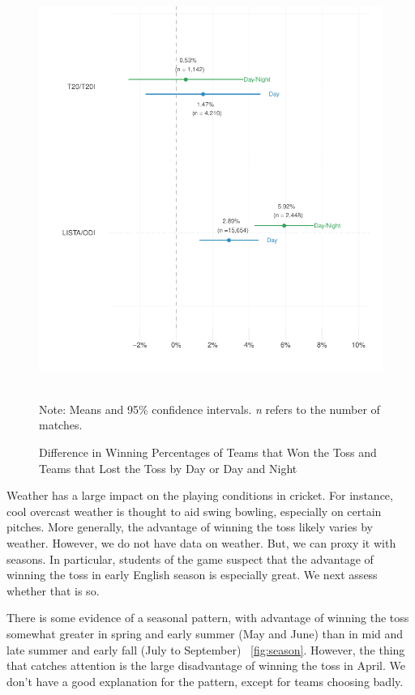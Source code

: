 \documentclass[12pt]{article}
\begin{document}
\begin{figure}[htbp]
\centering
\caption{Difference in Winning Percentages of Teams that Won the Toss and Teams that Lost the Toss by Day or Day and Night}
\includegraphics[scale=.95]{../figs/winbyDayNight.pdf}
{\footnotesize \\ Note: Means and 95\% confidence intervals. \emph{n} refers to the number of matches.\par}
\label{fig:dn}
\end{figure}

Weather has a large impact on the playing conditions in cricket. For instance, cool overcast weather is thought to aid swing bowling, especially on certain pitches. More generally, the advantage of winning the toss likely varies by weather. However, we do not have data on weather. But, we can proxy it with seasons. In particular, students of the game suspect that the advantage of winning the toss in early English season is especially great. We next assess whether that is so.

There is some evidence of a seasonal pattern, with advantage of winning the toss somewhat greater in spring and early summer (May and June) than in mid and late summer and early fall (July to September) ~\ref{fig:season}. However, the thing that catches attention is the large disadvantage of winning the toss in April. We don't have a good explanation for the pattern, except for teams choosing badly.  
\end{document}
